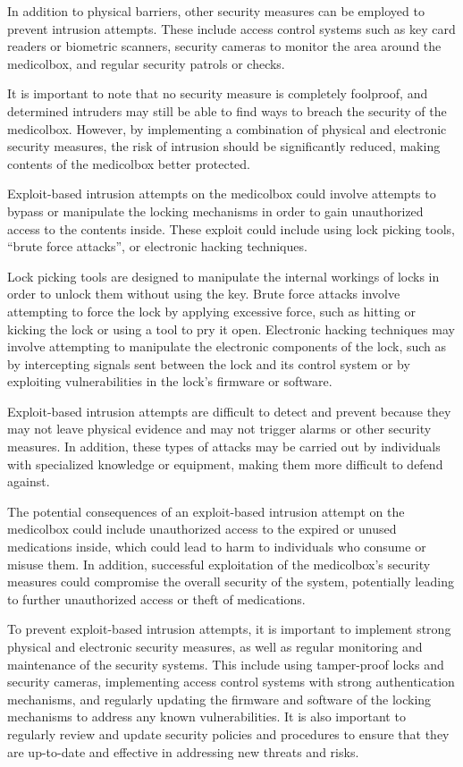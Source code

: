 \documentclass[../main.tex]{subfiles}
\begin{document}
In addition to physical barriers,
other security measures can be employed to prevent \gls{intrusion} attempts.
These include access control systems such as key card readers
or biometric scanners,
security cameras to monitor the area around the \gls{medicolbox},
and regular security patrols or checks.

It is important to note that no security measure is completely foolproof,
and determined intruders may still be able to find
ways to breach the security of the \gls{medicolbox}.
However, by implementing a combination of
physical and electronic security measures,
the risk of \gls{intrusion} should be significantly reduced,
making contents of the \gls{medicolbox} better protected.

Exploit-based \gls{intrusion} attempts on the \gls{medicolbox} could involve
attempts to bypass or manipulate the locking mechanisms
in order to gain unauthorized access to the contents inside.
These \gls{exploit} could include using lock picking tools,
\enquote{brute force attacks}, or electronic hacking techniques.

Lock picking tools are designed to manipulate the internal workings
of locks in order to unlock them without using the key.
Brute force attacks involve attempting to force the lock
by applying excessive force, such as hitting
or kicking the lock or using a tool to pry it open.
Electronic hacking techniques may involve attempting to manipulate
the electronic components of the lock,
such as by intercepting signals sent between the
lock and its control system
or by exploiting vulnerabilities in the lock's firmware or software.

Exploit-based \gls{intrusion} attempts are difficult to detect and prevent
because they may not leave physical evidence and may not
trigger alarms or other security measures.
In addition, these types of attacks may be carried out by individuals
with specialized knowledge or equipment,
making them more difficult to defend against.

The potential consequences of an exploit-based \gls{intrusion}
attempt on the \gls{medicolbox} could include unauthorized access to
the expired or unused medications inside,
which could lead to harm to individuals who consume or misuse them.
In addition, successful exploitation of
the \gls{medicolbox}'s security measures could compromise the
overall security of the system,
potentially leading to further unauthorized access
or theft of medications.

To prevent exploit-based \gls{intrusion} attempts,
it is important to implement strong physical
and electronic security measures,
as well as regular monitoring and maintenance of the security systems.
This include using tamper-proof locks and security cameras,
implementing access control systems with strong authentication mechanisms,
and regularly updating the firmware and software of
the locking mechanisms to address any known vulnerabilities.
It is also important to regularly review and update
security policies and procedures to ensure that
they are up-to-date and effective in addressing new threats and risks.
\end{document}
